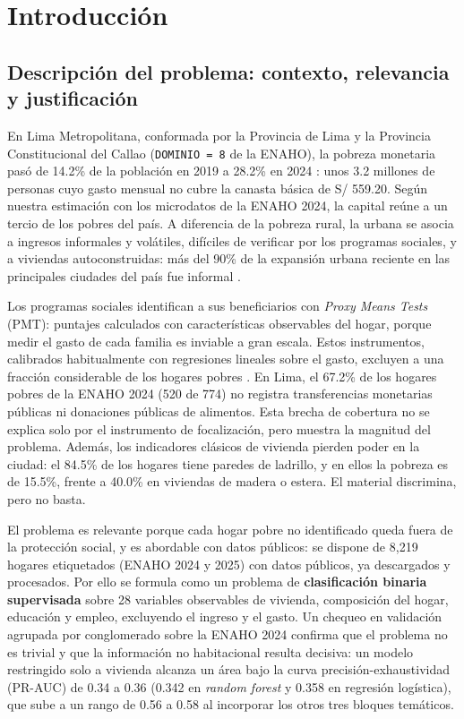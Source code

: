 \section{Introducción}

\subsection{Descripción del problema: contexto, relevancia y justificación}

En Lima Metropolitana, conformada por la Provincia de Lima y la Provincia Constitucional del Callao (\texttt{DOMINIO = 8} de la ENAHO), la pobreza monetaria pasó de 14.2\% de la población en 2019 a 28.2\% en 2024 \cite{inei2025pobreza}: unos 3.2 millones de personas cuyo gasto mensual no cubre la canasta básica de S/ 559.20. Según nuestra estimación con los microdatos de la ENAHO 2024, la capital reúne a un tercio de los pobres del país. A diferencia de la pobreza rural, la urbana se asocia a ingresos informales y volátiles, difíciles de verificar por los programas sociales, y a viviendas autoconstruidas: más del 90\% de la expansión urbana reciente en las principales ciudades del país fue informal \cite{espinoza2020mapeo}.

Los programas sociales identifican a sus beneficiarios con \textit{Proxy Means Tests} (PMT): puntajes calculados con características observables del hogar, porque medir el gasto de cada familia es inviable a gran escala. Estos instrumentos, calibrados habitualmente con regresiones lineales sobre el gasto, excluyen a una fracción considerable de los hogares pobres \cite{brown2018poor}. En Lima, el 67.2\% de los hogares pobres de la ENAHO 2024 (520 de 774) no registra transferencias monetarias públicas ni donaciones públicas de alimentos. Esta brecha de cobertura no se explica solo por el instrumento de focalización, pero muestra la magnitud del problema. Además, los indicadores clásicos de vivienda pierden poder en la ciudad: el 84.5\% de los hogares tiene paredes de ladrillo, y en ellos la pobreza es de 15.5\%, frente a 40.0\% en viviendas de madera o estera. El material discrimina, pero no basta.

El problema es relevante porque cada hogar pobre no identificado queda fuera de la protección social, y es abordable con datos públicos: se dispone de 8,219 hogares etiquetados (ENAHO 2024 y 2025) con datos públicos, ya descargados y procesados. Por ello se formula como un problema de \textbf{clasificación binaria supervisada} sobre 28 variables observables de vivienda, composición del hogar, educación y empleo, excluyendo el ingreso y el gasto. Un chequeo en validación agrupada por conglomerado sobre la ENAHO 2024 confirma que el problema no es trivial y que la información no habitacional resulta decisiva: un modelo restringido solo a vivienda alcanza un área bajo la curva precisión-exhaustividad (PR-AUC) de 0.34 a 0.36 (0.342 en \textit{random forest} y 0.358 en regresión logística), que sube a un rango de 0.56 a 0.58 al incorporar los otros tres bloques temáticos.

